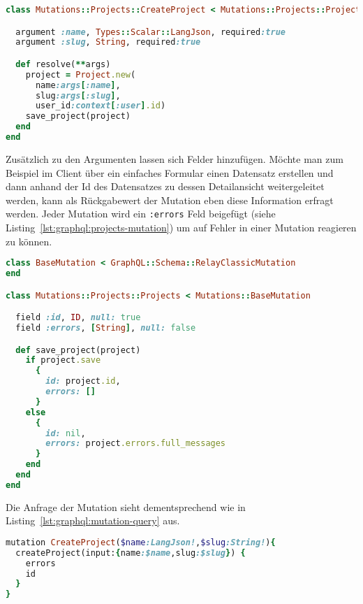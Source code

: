 \begin{lstlisting}[language=Ruby,float=h!,caption={Definition der Mutation CreateProject \lstinline|/graphql/mutations/projects/create_project.rb|}, label={lst:graphql:create_project}]
class Mutations::Projects::CreateProject < Mutations::Projects::Projects

  argument :name, Types::Scalar::LangJson, required:true
  argument :slug, String, required:true

  def resolve(**args)
    project = Project.new(
      name:args[:name],
      slug:args[:slug],
      user_id:context[:user].id)
    save_project(project)
  end
end
\end{lstlisting}

Zusätzlich zu den Argumenten lassen sich Felder hinzufügen. Möchte man zum Beispiel im Client über ein einfaches Formular einen Datensatz erstellen und dann anhand der Id des Datensatzes zu dessen Detailansicht weitergeleitet werden, kann als Rückgabewert der Mutation eben diese Information erfragt werden.
Jeder Mutation wird ein \lstinline|:errors| Feld beigefügt (siehe Listing~\ref{lst:graphql:projects-mutation}) um auf Fehler in einer Mutation reagieren zu können.

\begin{lstlisting}[language=Ruby,float=h!,caption={Definition der Oberklasse aller projects Mutationen \lstinline|/graphql/mutations/projects/projects.rb|}, label={lst:graphql:projects-mutation}]
class BaseMutation < GraphQL::Schema::RelayClassicMutation
end

class Mutations::Projects::Projects < Mutations::BaseMutation

  field :id, ID, null: true
  field :errors, [String], null: false

  def save_project(project)
    if project.save
      {
        id: project.id,
        errors: []
      }
    else
      {
        id: nil,
        errors: project.errors.full_messages
      }
    end
  end
end
\end{lstlisting}

Die Anfrage der Mutation sieht dementsprechend wie in Listing~\ref{lst:graphql:mutation-query} aus.

\begin{lstlisting}[language=Ruby,float=h!,caption={Anfrage der CreateProject Mutation}, label={lst:graphql:mutation-query}] 
mutation CreateProject($name:LangJson!,$slug:String!){
  createProject(input:{name:$name,slug:$slug}) {
    errors
	id
  }
}
\end{lstlisting}

